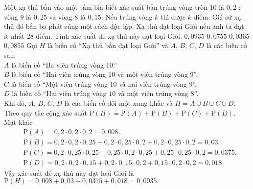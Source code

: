 \begin{ex}%
	Một xạ thủ bắn vào một tấm bia biết xác suất bắn trúng vòng tròn $10$ là $0{,}2$ ; vòng $9$ là $0{,}25$ và vòng $8$ là $0{,}15$. Nếu trúng vòng $k$ thì được $k$ điểm. Giả sử xạ thủ đó bắn ba phát súng một cách độc lập. Xạ thủ đạt loại Giỏi nếu anh ta đạt ít nhất $28$ điểm. Tính xác suất để xạ thủ này đạt loại Giỏi.
	\choice
	{\True $0{,}0935$}
	{$0{,}0755$}
	{$0{,}0365$}
	{$0{,}0855$}
	\loigiai
	{
		Gọi $H$ là biến cố ``Xạ thủ bắn đạt loại Giỏi'' và $A$, $B$, $C$, $D$ là các biến cố sau:\\
		$A$ là biến cố ``Ba viên trúng vòng $10$.''\\
		$B$ là biến cố ``Hai viên trúng vòng $10$ và một viên trúng vòng $9$''.\\
		$C$ là biến cố ``Một viên trúng vòng $10$ và hai viên trúng vòng $9$''.\\
		$D$ là biến cố ``Hai viên trúng vòng $10$ và một viên trúng vòng $8$''.\\
		Khi đó, $A$, $B$, $C$, $D$ là các biến cố đôi một xung khắc và $H=A\cup B\cup C\cup D$.\\
		Theo quy tắc cộng xác suất $\mathrm{P}(H)=\mathrm{P}(A)+\mathrm{P}(B)+\mathrm{P}(C)+\mathrm{P}(D).$\\
		Mặt khác
		\begin{align*}
		&\mathrm{P}(A)=0{,}2\cdot 0{,}2\cdot 0{,}2=0{,}008.\\
		&\mathrm{P}(B)=0{,}2\cdot 0{,}2\cdot 0{,}25+0{,}2\cdot 0{,}25\cdot 0{,}2+0{,}2\cdot 0{,}25\cdot 0{,}2=0{,}03.\\
		&\mathrm{P}(C)=0{,}2\cdot 0{,}25\cdot 0{,}25+0{,}25\cdot 0{,}2\cdot 0{,}25+0{,}25\cdot 0{,}25\cdot 0{,}2=0{,}0375.\\
		&\mathrm{P}(D)=0{,}2\cdot 0{,}2\cdot 0{,}15+0{,}2\cdot 0{,}15\cdot 0{,}2+0{,}15\cdot 0{,}2\cdot 0{,}2=0{,}018.
		\end{align*}
		Vậy xác suất để xạ thủ này đạt loại Giỏi là $\mathrm{P}(H)=0{,}008+0{,}03+0{,}0375+0{,}018=0{,}0935.$
	}
\end{ex}

